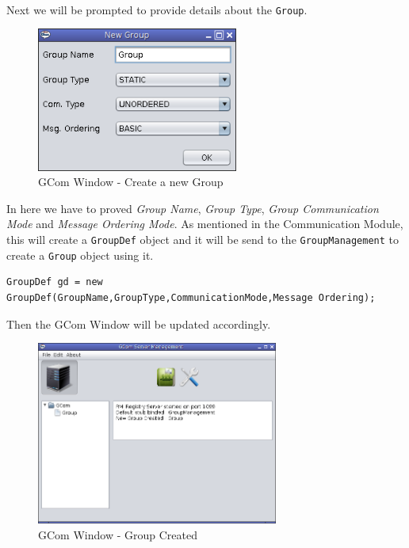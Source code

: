 \documentclass[a4paper,english,twoside]{article}
\begin{document}
\paragraph{}
Next we will be prompted to provide details about the \texttt{Group}.

\begin{figure}[h]
\begin{center}
\includegraphics[width=250px]{GCome-Group.png}
\caption{GCom Window - Create a new Group}
\end{center}
\end{figure}

In here we have to proved \textit{Group Name}, \textit{Group Type}, \textit{Group Communication Mode} and \textit{Message Ordering Mode}. As mentioned in the Communication Module, this will create a \texttt{GroupDef} object and it will be send to the \texttt{GroupManagement} to create a \texttt{Group} object using it.

{ \begin{lstlisting}
GroupDef gd = new GroupDef(GroupName,GroupType,CommunicationMode,Message Ordering);
\end{lstlisting}}
\noindent
Then the GCom Window will be updated accordingly.

\begin{figure}[h]
\begin{center}
\includegraphics[width=300px]{GCom-2.png}
\caption{GCom Window - Group Created}
\end{center}
\end{figure}
\newpage
\end{document}
